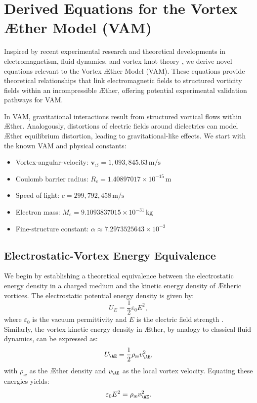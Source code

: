 
\section{Derived Equations for the Vortex Æther Model (VAM)}
Inspired by recent experimental research and theoretical developments in electromagnetism, fluid dynamics, and vortex knot theory
\cite{Matsoukas2014,Kleckner2013,Ricca1998}, we derive novel equations relevant to the Vortex Æther Model (VAM). These equations provide
theoretical relationships
that link electromagnetic fields to structured vorticity fields within an incompressible Æther, offering potential experimental validation pathways for VAM.

In VAM, gravitational interactions result from structured vortical flows within Æther. Analogously, distortions of electric fields around dielectrics can model Æther equilibrium distortion, leading to gravitational-like effects.
We start with the known VAM and physical constants:

\begin{itemize}
    \item Vortex-angular-velocity: $\mathbf{v}_{\scriptscriptstyle\boldsymbol{\circlearrowleft}} = 1,093,845.63\, \text{m/s}$
    \item Coulomb barrier radius: $R_c = 1.40897017\times10^{-15}\, \text{m}$
    \item Speed of light: $c = 299,792,458\, \text{m/s}$
    \item Electron mass: $M_e = 9.1093837015\times10^{-31}\, \text{kg}$
    \item Fine-structure constant: $\alpha \approx 7.2973525643\times10^{-3}$
\end{itemize}



\subsection{Electrostatic-Vortex Energy Equivalence}
We begin by establishing a theoretical equivalence between the electrostatic energy density in a charged medium and the kinetic energy density of Ætheric vortices. The electrostatic potential energy density is given by:
\begin{equation}
    U_E = \frac{1}{2} \varepsilon_0 E^2,
\end{equation}
where $\varepsilon_0$ is the vacuum permittivity and $E$ is the electric field strength \cite{Matsoukas2014}.
Similarly, the vortex kinetic energy density in Æther, by analogy to classical fluid dynamics, can be expressed as:
\begin{equation}
    U_{\AE} = \frac{1}{2}\rho_\text{\ae} v_{\AE}^2,
\end{equation}
with $\rho_\text{\ae}$ as the Æther density and $v_{\AE}$ as the local vortex velocity.
Equating these energies yields:
\begin{equation}\label{eq:energy_equivalence}
\varepsilon_0 E^2 = \rho_\text{\ae} v_{\AE}^2.
\end{equation}
